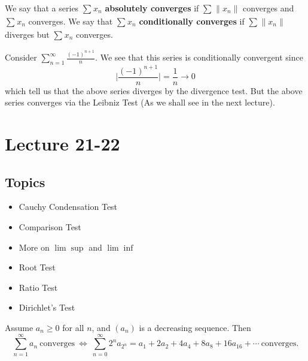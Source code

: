 \documentclass[a4paper]{article}
\begin{document}
\begin{definition}
    We say that a series \( \sum_{  }^{  }{x}_{n} \) \textbf{absolutely converges} if \( \sum_{  }^{  } \|{x}_{n}\| \) converges and \( \sum_{  }^{  } {x}_{n} \) converges. We say that \( \sum_{  }^{  }{x}_{n} \) \textbf{conditionally converges} if \( \sum_{  }^{  } \|{x}_{n}\|  \) diverges but \( \sum_{  }^{  } {x}_{n} \) converges. 
\end{definition}

\begin{eg}
    Consider \( \sum_{ n=1  }^{ \infty  } \frac{ (-1)^{n+1} }{ n }  \). We see that this series is conditionally convergent since  
    \[  \Big| \frac{ (-1)^{n+1} }{ n }  \Big|  = \frac{ 1 }{ n } \to 0 \]
    which tell us that the above series diverges by the divergence test. But the above series converges via the Leibniz Test (As we shall see in the next lecture).
\end{eg}

\section{Lecture 21-22}

\subsection{Topics}

\begin{itemize}
    \item Cauchy Condensation Test
    \item Comparison Test
    \item More on \( \lim \sup   \) and \( \lim \inf  \)
    \item Root Test
    \item Ratio Test
    \item Dirichlet's Test
\end{itemize}

\begin{theorem}
    Assume \( {a}_{n} \geq 0  \) for all \( n  \), and \( ({a}_{n}) \) is a decreasing sequence. Then
    \[  \sum_{ n=1  }^{ \infty  } {a}_{n} \ \text{converges} \ \iff \ \sum_{ n=0 }^{ \infty  } 2^{n} {a}_{2^{n}} = {a}_{1} + {2a}_{2} + {4a}_{4} + {8a}_{8} + {16a}_{16} + \cdots \ \text{converges}. \]
\end{theorem} 
\end{document}
